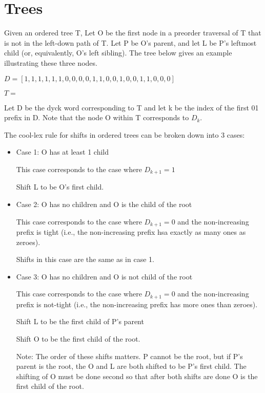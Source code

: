 \documentclass{article}
\begin{document}
\section{Trees}


Given an ordered tree T, Let O be the first node in a preorder traversal of T that is not in the left-down path of T. Let P be O's parent, and let L be P's leftmost child (or, equivalently, O's left sibling).  The tree below gives an example illustrating these three nodes. 

$D=[1, 1, 1, 1, 1, 1, 0, 0, 0, 0, 1, 1, 0, 0, 1, 0, 0, 1, 1, 0, 0, 0]$

$T=$


\noindent Let D be the dyck word corresponding to T and let k be the index of the first 01 prefix in D. Note that the node O within T corresponds to $D_k$.

\noindent The cool-lex rule for shifts in ordered trees can be broken down into 3 cases:
\begin{itemize}
    \item Case 1: O has at least 1 child
	
	This case corresponds to the case where $D_{k+1}=1$
	
	Shift L to be O's first child. 


    \item Case 2: O has no children and O is the child of the root

	This case corresponds to the case where $D_{k+1}=0$ and the non-increasing prefix is tight (i.e., the non-increasing prefix hsa exactly as many ones as zeroes).
	
	Shifts in this case are the same as in case 1. 
    \item Case 3: O has no children and O is not child of the root

	This case corresponds to the case where $D_{k+1}=0$ and the non-increasing prefix is not-tight (i.e., the non-increasing prefix has more ones than zeroes). 

	Shift L to be the first child of P's parent

	Shift O to be the first child of the root. 

	Note: The order of these shifts matters. P cannot be the root, but if P's parent is the root, the O and L are both shifted to be P's first child. The shifting of O must be done second so that after both shifts are done O is the first child of the root. 


\end{itemize}
\end{document}
